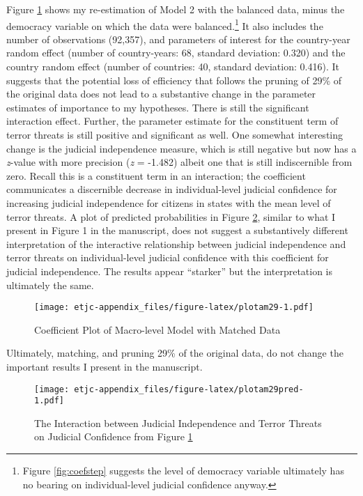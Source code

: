 \documentclass[11pt,]{article}
\makeatletter
\def\maxwidth{\ifdim\Gin@nat@width>\linewidth\linewidth
\else\Gin@nat@width\fi}
\let\Oldincludegraphics\includegraphics
\renewcommand{\includegraphics}[1]{\Oldincludegraphics[width=\maxwidth]{#1}}
\makeatother
\begin{document}
Figure \ref{fig:plotam29} shows my re-estimation of Model 2 with the
balanced data, minus the democracy variable on which the data were
balanced.\footnote{Figure \ref{fig:coefstep} suggests the level of
  democracy variable ultimately has no bearing on individual-level
  judicial confidence anyway.} It also includes the number of
observations (92,357), and parameters of interest for the country-year
random effect (number of country-years: 68, standard deviation: 0.320)
and the country random effect (number of countries: 40, standard
deviation: 0.416). It suggests that the potential loss of efficiency
that follows the pruning of 29\% of the original data does not lead to a
substantive change in the parameter estimates of importance to my
hypotheses. There is still the significant interaction effect. Further,
the parameter estimate for the constituent term of terror threats is
still positive and significant as well. One somewhat interesting change
is the judicial independence measure, which is still negative but now
has a \emph{z}-value with more precision (\emph{z} = -1.482) albeit one
that is still indiscernible from zero. Recall this is a constituent term
in an interaction; the coefficient communicates a discernible decrease
in individual-level judicial confidence for increasing judicial
independence for citizens in states with the mean level of terror
threats. A plot of predicted probabilities in Figure
\ref{fig:plotam29pred}, similar to what I present in Figure 1 in the
manuscript, does not suggest a substantively different interpretation of
the interactive relationship between judicial independence and terror
threats on individual-level judicial confidence with this coefficient
for judicial independence. The results appear ``starker'' but the
interpretation is ultimately the same.

\begin{figure}[htbp]
\centering
\texttt{[image: etjc-appendix\_files/figure-latex/plotam29-1.pdf]}
\caption{\label{fig:plotam29} Coefficient Plot of Macro-level Model with
Matched Data}
\end{figure}

Ultimately, matching, and pruning 29\% of the original data, do not
change the important results I present in the manuscript.

\begin{figure}[htbp]
\centering
\texttt{[image: etjc-appendix\_files/figure-latex/plotam29pred-1.pdf]}
\caption{\label{fig:plotam29pred} The Interaction between Judicial
Independence and Terror Threats on Judicial Confidence from Figure
\ref{fig:plotam29}}
\end{figure}
\end{document}
